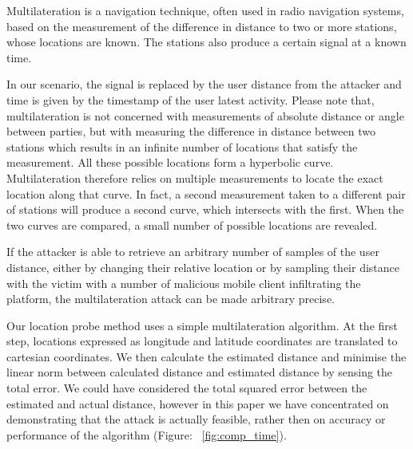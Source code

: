 Multilateration is a navigation technique, often used in radio navigation systems, based on the measurement of the difference in distance to two or more stations, whose locations are known. The stations also produce a certain signal at a known time.\

In our scenario, the signal is replaced by the user distance from the attacker and time is given by the timestamp of the user latest activity. Please note that, multilateration is not concerned with measurements of absolute distance or angle between parties, but with measuring the difference in distance between two stations which results in an infinite number of locations that satisfy the measurement. All these possible locations form a hyperbolic curve. Multilateration therefore relies on multiple measurements to locate the exact location along that curve. In fact, a second measurement taken to a different pair of stations will produce a second curve, which intersects with the first. When the two curves are compared, a small number of possible locations are revealed.

If the attacker is able to retrieve an arbitrary number of samples of the user distance, either by changing their relative location or by sampling their distance with the victim with a number of malicious mobile client infiltrating the platform, the multilateration attack can be made arbitrary precise.

Our location probe method uses a simple multilateration algorithm. At the first step, locations expressed as longitude and latitude coordinates are translated to cartesian coordinates. We then calculate the estimated distance and minimise the linear norm between calculated distance and estimated distance by sensing the total error. We could have considered the total squared error between the estimated and actual distance, however in this paper we have concentrated on demonstrating that the attack is actually feasible, rather then on accuracy or performance of the algorithm (Figure: ~\ref{fig:comp_time}).

